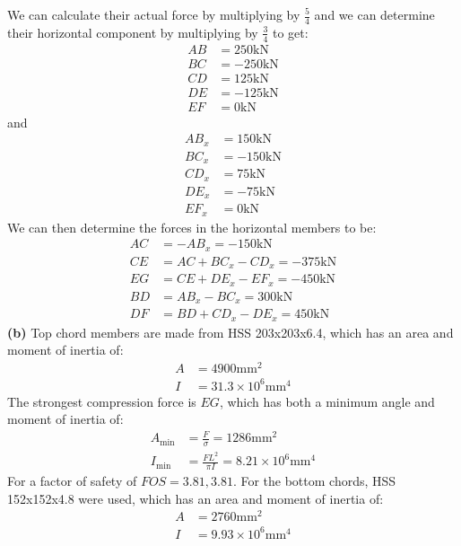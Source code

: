 \documentclass{article}
\begin{document}
We can calculate their actual force by multiplying by $\frac{5}{4}$ and we can determine their horizontal component by multiplying by $\frac{3}{4}$ to get:
\begin{align*}
  AB &= 250\si{\kilo\newton} \\
  BC &= -250\si{\kilo\newton} \\ 
  CD &= 125\si{\kilo\newton} \\ 
  DE &= -125\si{\kilo\newton} \\ 
  EF &= 0\si{\kilo\newton}
\end{align*}
and
\begin{align*}
  AB_x &= 150\si{\kilo\newton} \\
  BC_x &= -150\si{\kilo\newton} \\ 
  CD_x &= 75\si{\kilo\newton} \\ 
  DE_x &= -75\si{\kilo\newton} \\ 
  EF_x &= 0\si{\kilo\newton}
\end{align*}
We can then determine the forces in the horizontal members to be:
\begin{align*}
  AC &= -AB_x = -150\si{\kilo\newton} \\ 
  CE &= AC+BC_x-CD_x = -375\si{\kilo\newton} \\ 
  EG &= CE+DE_x-EF_x = -450\si{\kilo\newton} \\ 
  BD &= AB_x - BC_x = 300\si{\kilo\newton} \\ 
  DF &= BD+CD_x-DE_x = 450\si{\kilo\newton}
\end{align*}
\textbf{(b)} Top chord members are made from HSS 203x203x6.4, which has an area and moment of inertia of:
\begin{align}
  A &= 4900 \si{\milli\meter\squared} \\ 
  I &= 31.3 \times 10^6 \si{\milli\meter\tothe{4}}
  \label{eq:}
\end{align}
The strongest compression force is $EG$, which has both a minimum angle and moment of inertia of:
\begin{align}
  A_\text{min} &= \frac{F}{\sigma} = 1286 \si{\milli\meter\squared} \\ 
  I_\text{min} &= \frac{FL^2}{\pi I} = 8.21 \times 10^6 \si{\milli\meter\tothe{4}}
\end{align}
For a factor of safety of $FOS = 3.81, 3.81$. For the bottom chords, HSS 152x152x4.8 were used, which has an area and moment of inertia of:
\begin{align}
  A &= 2760\si{\milli\meter\squared} \\ 
  I &= 9.93 \times 10^6 \si{\milli\meter\tothe{4}}
\end{align}
\end{document}

